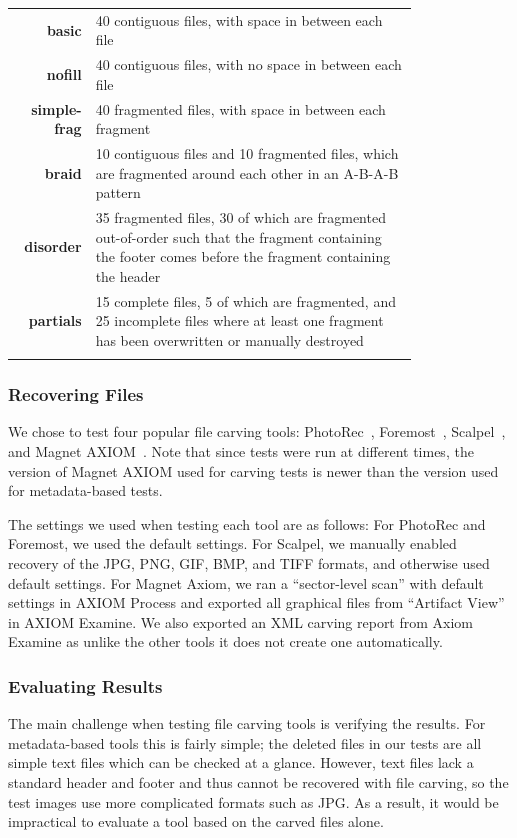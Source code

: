 \begin{table}[ht!]
{\begin{tabular*}{\textwidth}{@{}rp{0.8\linewidth}@{}} \toprule
\textbf{basic} & 40 contiguous files, with space in between each file \\
\textbf{nofill} & 40 contiguous files, with no space in between each file \\
\textbf{simple-frag} & 40 fragmented files, with space in between each fragment \\
\textbf{braid} & 10 contiguous files and 10 fragmented files, which are fragmented around each other in an A-B-A-B pattern \\
\textbf{disorder} & 35 fragmented files, 30 of which are fragmented out-of-order such that the fragment containing the footer comes before the fragment containing the header \\
\textbf{partials} & 15 complete files, 5 of which are fragmented, and 25 incomplete files where at least one fragment has been overwritten or manually destroyed \\
\botrule
\end{tabular*}}
\label{carve_cases}
\end{table}


\subsubsection{Recovering Files}

We chose to test four popular file carving tools: PhotoRec~\cite{photorec}, Foremost~\cite{foremost}, Scalpel~\cite{scalpel}, and Magnet AXIOM~\cite{axiom_carve}.
Note that since tests were run at different times, the version of Magnet AXIOM used for carving tests is newer than the version used for metadata-based tests.

The settings we used when testing each tool are as follows:
For PhotoRec and Foremost, we used the default settings.
For Scalpel, we manually enabled recovery of the JPG, PNG, GIF, BMP, and TIFF formats, and otherwise used default settings.
For Magnet Axiom, we ran a ``sector-level scan'' with default settings in AXIOM Process and exported all graphical files from ``Artifact View'' in AXIOM Examine.
We also exported an XML carving report from Axiom Examine as unlike the other tools it does not create one automatically.

\subsubsection{Evaluating Results}
The main challenge when testing file carving tools is verifying the results. 
For metadata-based tools this is fairly simple; the deleted files in our tests are all simple text files which can be checked at a glance.
However, text files lack a standard header and footer and thus cannot be recovered with file carving, so the test images use more complicated formats such as JPG.
As a result, it would be impractical to evaluate a tool based on the carved files alone.

